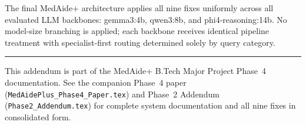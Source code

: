 \documentclass[a4paper,12pt]{article}
\begin{document}
\noindent The final MedAide+ architecture applies all nine fixes
uniformly across all evaluated LLM backbones: gemma3:4b, qwen3:8b,
and phi4-reasoning:14b. No model-size branching is
applied; each backbone receives identical pipeline treatment with
specialist-first routing determined solely by query category.

\vfill
\noindent\hrule\smallskip
\noindent\small This addendum is part of the MedAide+ B.Tech Major Project
Phase~4 documentation. See the companion Phase~4 paper
(\texttt{MedAidePlus\_Phase4\_Paper.tex}) and Phase~2 Addendum
(\texttt{Phase2\_Addendum.tex}) for complete system documentation and
all nine fixes in consolidated form.
\end{document}
